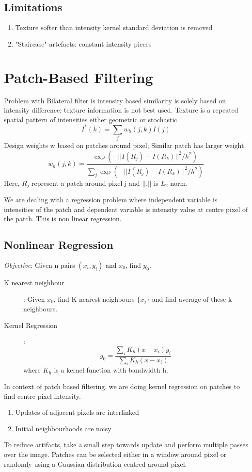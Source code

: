 \documentclass[a4paper]{article}
\begin{document}
\subsection{Limitations}
\begin{enumerate}
\item Texture softer than intensity kernel standard deviation is removed
\item "Staircase" artefacts: constant intensity pieces
\end{enumerate}

\section{Patch-Based Filtering}
Problem with Bilateral filter is intensity based similarity is solely based on intensity difference; texture information is not best used. Texture is a repeated spatial pattern of intensities either geometric or stochastic.
$$I^*(k) = \sum_{j}w_h(j,k)I(j)$$
Design weights w based on patches around pixel; Similar patch has larger weight.
$$w_h(j,k) = \frac{\exp{(-||I(R_j)-I(R_k)||^2/h^2)}}{\sum_{j}\exp{(-||I(R_j)-I(R_k)||^2/h^2)}}$$
Here, $R_j$ represent a patch around pixel j and $||.||$ is $L_2$ norm.
\medskip

We are dealing with a regression problem where independent variable is intensities of the patch and dependent variable is intensity value at centre pixel of the patch. This is non linear regression.

\subsection{Nonlinear Regression}
\textit{Objective}: Given n pairs $(x_i, y_i)$ and $x_0$, find $y_0$.
\begin{description}
\item[K nearest neighbour]: Given $x_0$, find K nearest neighbours $\{x_j\}$ and find average of these k neighbours.
\item[Kernel Regression]: $$y_0 = \frac{\sum_i K_h(x-x_i)y_i }{\sum_i K_h(x-x_i)}$$ where $K_h$ is a kernel function with bandwidth h.
\end{description}
In context of patch based filtering, we are doing kernel regression on patches to find centre pixel intensity.
\begin{enumerate}
\item Updates of adjacent pixels are interlinked
\item Initial neighbourhoods are noisy
\end{enumerate}
To reduce artifacts, take a small step towards update and perform multiple passes over the image.
Patches can be selected either in a window around pixel or randomly using a Gaussian distribution centred around pixel.
\end{document}
